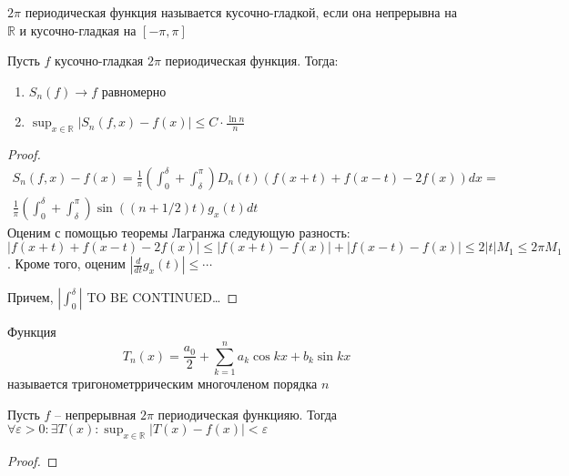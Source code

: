 \documentclass[document.tex]{subfiles}
\begin{document}
\begin{definition}
	$2 \pi$ периодическая функция называется кусочно-гладкой, если она непрерывна на $\mathbb{R}$ и кусочно-гладкая на $[-\pi, \pi]$
\end{definition}

\begin{theorem}
	Пусть $f$ кусочно-гладкая $2 \pi$ периодическая функция. Тогда:
	\begin{enumerate}
		\item $S_n(f) \rightarrow f$ равномерно
		\item $\sup_{x \in \mathbb{R}} |S_n(f, x) - f(x)| \leq C \cdot \frac{\ln n}{n}$
	\end{enumerate}
\end{theorem}

\begin{proof}
	\begin{multline*}
		S_n(f, x) - f(x) = \frac{1}{\pi} \left( \int_{0}^{\delta} + \int_{\delta}^{\pi} \right) D_n(t) (f(x+t) + f(x-t) - 2f(x))dx = \\
		\frac{1}{\pi} \left( \int_{0}^{\delta} + \int_{\delta}^{\pi} \right) \sin ((n + 1/2)t) g_x(t) dt
	\end{multline*}
	Оценим с помощью теоремы Лагранжа следующую разность: $|f(x+t) + f(x-t) - 2f(x)| \leq |f(x+t) - f(x)| + |f(x - t) - f(x)| \leq 2 |t| M_1 \leq 2 \pi M_1$. Кроме того, оценим
	$|\frac{d}{dt} g_x(t)| \leq \cdots$

	Причем, $|\int_{0}^{\delta} |$
    TO BE CONTINUED\ldots
\end{proof}

\begin{definition}
	Функция
	$$T_n(x) = \frac{a_0}{2} + \sum_{k = 1}^n a_k \cos kx + b_k \sin kx$$
	называется тригонометррическим многочленом порядка $n$
\end{definition}

\begin{theorem}
	Пусть $f$ -- непрерывная $2 \pi$ периодическая функцияю. Тогда $\forall \varepsilon > 0 : \exists T(x) : \sup_{x \in \mathbb{R}} |T(x) - f(x)| < \varepsilon$
\end{theorem}

\begin{proof}

\end{proof}
\end{document}
